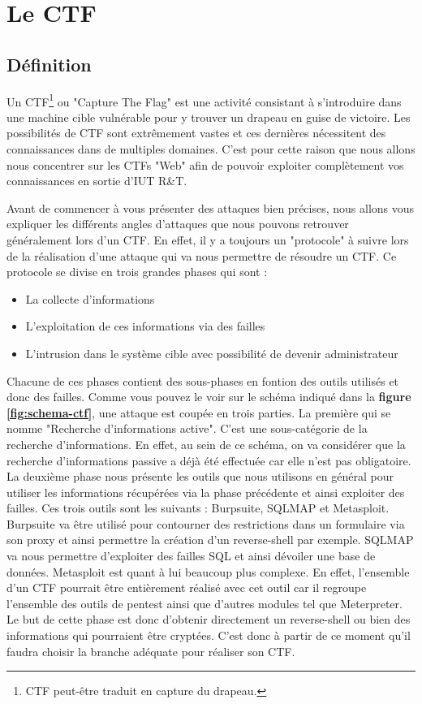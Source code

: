 \chapter{Le CTF}

\section{Définition}

Un CTF\footnote{CTF peut-être traduit en capture du drapeau.} ou "Capture The Flag" est une activité consistant à s'introduire dans une machine cible vulnérable pour y trouver un drapeau en guise de victoire. Les possibilités de CTF sont extrêmement vastes et ces dernières nécessitent des connaissances dans de multiples domaines. C'est pour cette raison que nous allons nous concentrer sur les CTFs "Web" afin de pouvoir exploiter complètement vos connaissances en sortie d'IUT R\&T. 

Avant de commencer à vous présenter des attaques bien précises, nous allons vous expliquer les différents angles d'attaques que nous pouvons retrouver généralement lors d'un CTF. En effet, il y a toujours un "protocole" à suivre lors de la réalisation d'une attaque qui va nous permettre de résoudre un CTF. Ce protocole se divise en trois grandes phases qui sont :
\begin{itemize}
    \item La collecte d'informations
    \item L'exploitation de ces informations via des failles
    \item L'intrusion dans le système cible avec possibilité de devenir administrateur\\
\end{itemize}

Chacune de ces phases contient des sous-phases en fontion des outils utilisés et donc des failles. Comme vous pouvez le voir sur le schéma indiqué dans la \textbf{figure \ref{fig:schema-ctf}}, une attaque est coupée en trois parties. La première qui se nomme "Recherche d'informations active". C'est une sous-catégorie de la recherche d'informations. En effet, au sein de ce schéma, on va considérer que la recherche d'informations passive a déjà été effectuée car elle n'est pas obligatoire. La deuxième phase nous présente les outils que nous utilisons en général pour utiliser les informations récupérées via la phase précédente et ainsi exploiter des failles. Ces trois outils sont les suivants : Burpsuite, SQLMAP et Metasploit. Burpsuite va être utilisé pour contourner des restrictions dans un formulaire via son proxy et ainsi permettre la création d'un reverse-shell par exemple. SQLMAP va nous permettre d'exploiter des failles SQL et ainsi dévoiler une base de données. Metasploit est quant à lui beaucoup plus complexe. En effet, l'ensemble d'un CTF pourrait être entièrement réalisé avec cet outil car il regroupe l'ensemble des outils de pentest ainsi que d'autres modules tel que Meterpreter. Le but de cette phase est donc d'obtenir directement un reverse-shell ou bien des informations qui pourraient être cryptées. C'est donc à partir de ce moment qu'il faudra choisir la branche adéquate pour réaliser son CTF.

